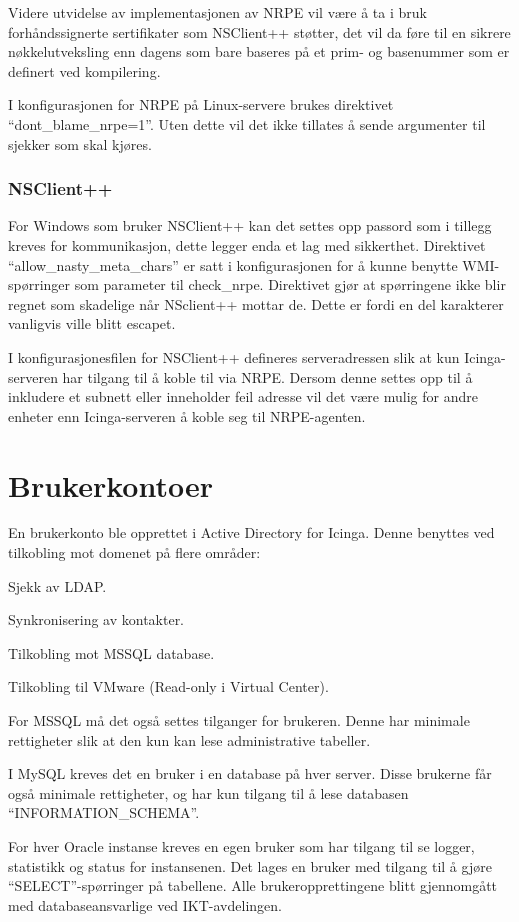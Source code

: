 Videre utvidelse av implementasjonen av NRPE vil være å ta i bruk forhåndssignerte sertifikater 
som NSClient++ støtter, det vil da føre til en sikrere nøkkelutveksling enn dagens som bare baseres på et prim- og basenummer som er definert ved kompilering.

I konfigurasjonen for NRPE på Linux-servere brukes direktivet ``dont\_blame\_nrpe=1''. Uten dette vil det ikke tillates å sende argumenter til sjekker som skal kjøres.
\subsubsection{NSClient++}
For Windows som bruker NSClient++ kan det settes opp passord som i tillegg kreves for kommunikasjon, dette legger enda et lag med sikkerthet.
Direktivet ``allow\_nasty\_meta\_chars'' er satt i konfigurasjonen for å kunne benytte  WMI-spørringer som parameter til check\_nrpe. Direktivet gjør at spørringene ikke blir regnet som skadelige når NSclient++ mottar de. Dette er fordi en del karakterer vanligvis ville blitt escapet.

I konfigurasjonesfilen for NSClient++ defineres serveradressen slik at kun Icinga-serveren har tilgang til å koble til via NRPE. Dersom denne settes opp til å inkludere et subnett eller inneholder feil adresse vil det være mulig for andre enheter enn Icinga-serveren å koble seg til NRPE-agenten.

\section{Brukerkontoer}
En brukerkonto ble opprettet i Active Directory for Icinga. Denne benyttes ved tilkobling mot domenet på flere områder:
\begin{itemize*}
	\item Sjekk av LDAP.
	\item Synkronisering av kontakter.
	\item Tilkobling mot MSSQL database.
	\item Tilkobling til VMware (Read-only i Virtual Center).
\end{itemize*}
For MSSQL må det også settes tilganger for brukeren. Denne har minimale rettigheter slik at den kun kan lese administrative tabeller. 

I MySQL kreves det en bruker i en database på hver server. Disse brukerne får også minimale rettigheter, og har kun tilgang til å lese databasen ``INFORMATION\_SCHEMA''. 

For hver Oracle instanse kreves en egen bruker som har tilgang til se logger, statistikk og status for instansenen. Det lages en bruker med tilgang til å gjøre ``SELECT''-spørringer på tabellene.
Alle brukeropprettingene blitt gjennomgått med databaseansvarlige ved IKT-avdelingen. 

